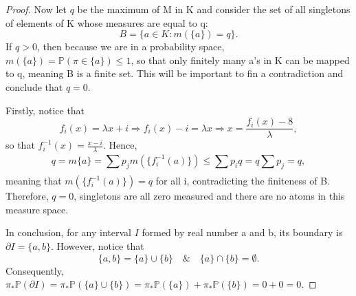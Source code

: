 \documentclass[a4paper]{article}
\theoremstyle{plain}
\theoremstyle{definition}
\begin{document}
\begin{proof}
  Now let \(q\) be the maximum of M in K and consider the set of all singletons of elements of K whose measures are equal to q:
  \[
    B = \{a\in K: m(\{a\}) = q\}.
  \]
  If \(q > 0\), then because we are in a probability space, \(m(\{a\}) = \mathbb{P}(\pi \in \{a\})\leq 1\), so that only
finitely many a's in K can be mapped to q, meaning B is a finite set. This will be important to fin a contradiction and conclude
that \(q=0.\)

  Firstly, notice that 
  \[
    f_{i}(x) = \lambda x + i \Rightarrow f_{i}(x)-i = \lambda x \Rightarrow x = \frac{f_{i}(x) - 8}{\lambda },
  \]
so that \(f_{i}^{-1}(x) = \frac{x-i}{\lambda }.\) Hence, 
  \[
    q = m\{a\} = \sum\limits_{}^{}p_{j}m(\{f_{i}^{-1}(a)\})\leq \sum\limits_{}^{}p_{i} q = q \sum\limits_{}^{}p_{j} = q,
  \]
meaning that \(m(\{f_{i}^{-1}(a)\}) = q\) for all i, contradicting the finiteness of B. Therefore, \(q = 0\), singletons are all
zero measured and there are no atoms in this measure space.

  In conclusion, for any interval \(I\) formed by real number a and b, its boundary is \(\partial I = \{a, b\}\). However, notice that 
  \[
    \{a, b\} = \{a\}\cup \{b\}\quad\&\quad \{a\}\cap \{b\} = \emptyset.  
  \]
Consequently, \(\pi_{*}\mathbb{P}(\partial I) = \pi_{*}\mathbb{P}(\{a\}\cup \{b\}) = \pi_{*}\mathbb{P}(\{a\}) + \pi_{*}\mathbb{P}(\{b\}) = 0 + 0 = 0.\)
\end{proof}
\end{document}
